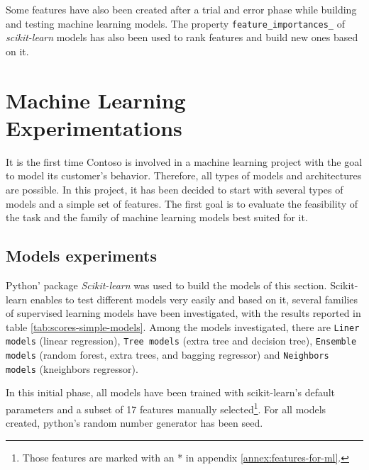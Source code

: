 Some features have also been created after a trial and error phase while building and testing machine learning models. The property \texttt{feature\_importances\_} of \textit{scikit-learn} models has also been used to rank features and build new ones based on it.



\section{Machine Learning Experimentations} \label{sec:ml-experimentation}

It is the first time Contoso is involved in a machine learning project with the goal to model its customer's behavior. Therefore, all types of models and architectures are possible. In this project, it has been decided to start with several types of models and a simple set of features. The first goal is to evaluate the feasibility of the task and the family of machine learning models best suited for it. 


\subsection{Models experiments}
Python' package \textit{Scikit-learn} was used to build the models of this section. Scikit-learn enables to test different models very easily and based on it, several families of supervised learning models have been investigated, with the results reported in table \ref{tab:scores-simple-models}. Among the models investigated, there are \texttt{Liner models} (linear regression), \texttt{Tree models} (extra tree and decision tree), \texttt{Ensemble models} (random forest, extra trees, and bagging regressor) and \texttt{Neighbors models} (kneighbors regressor).

In this initial phase, all models have been trained with scikit-learn's default parameters and a subset of 17 features manually selected\footnote{Those features are marked with an * in appendix \ref{annex:features-for-ml}.}. For all models created, python's random number generator has been seed.

